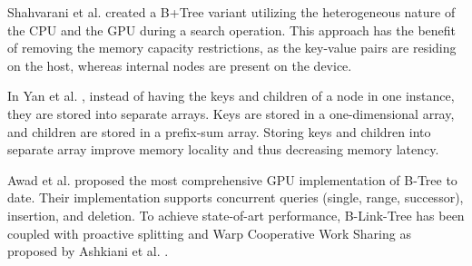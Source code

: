 Shahvarani et al. \cite{hb+tree} created a B+Tree variant utilizing the heterogeneous nature of the CPU and the GPU during a search operation. This approach has the benefit of removing the memory capacity restrictions, as the key-value pairs are residing on the host, whereas internal nodes are present on the device.

In Yan et al. \cite{harmonia}, instead of having the keys and children of a node in one instance, they are stored into separate arrays. Keys are stored in a one-dimensional array, and children are stored in a prefix-sum array. Storing keys and children into separate array improve memory locality and thus decreasing memory latency.

Awad et al. \cite{awad} proposed the most comprehensive GPU implementation of B-Tree to date. Their implementation supports concurrent queries (single, range, successor), insertion, and deletion. To achieve state-of-art performance, B-Link-Tree has been coupled with proactive splitting and Warp Cooperative Work Sharing as proposed by Ashkiani et al. \cite{ashkiani2018dynamic}.


